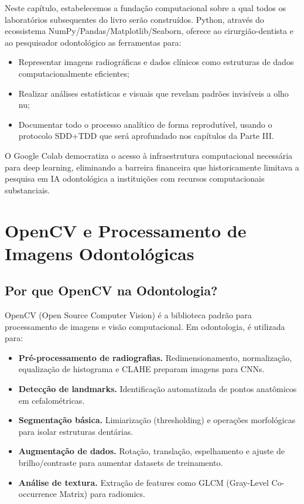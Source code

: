 Neste capítulo, estabelecemos a fundação computacional sobre a qual todos os laboratórios subsequentes do livro serão construídos. Python, através do ecossistema NumPy/Pandas/Matplotlib/Seaborn, oferece ao cirurgião-dentista e ao pesquisador odontológico as ferramentas para:

\begin{itemize}
    \item Representar imagens radiográficas e dados clínicos como estruturas de dados computacionalmente eficientes;
    \item Realizar análises estatísticas e visuais que revelam padrões invisíveis a olho nu;
    \item Documentar todo o processo analítico de forma reprodutível, usando o protocolo SDD+TDD que será aprofundado nos capítulos da Parte III.
\end{itemize}

O Google Colab democratiza o acesso à infraestrutura computacional necessária para deep learning, eliminando a barreira financeira que historicamente limitava a pesquisa em IA odontológica a instituições com recursos computacionais substanciais.

\section{OpenCV e Processamento de Imagens Odontológicas}

\subsection{Por que OpenCV na Odontologia?}

OpenCV (Open Source Computer Vision)  é a biblioteca padrão para processamento de imagens e visão computacional. Em odontologia, é utilizada para:

\begin{itemize}
    \item \textbf{Pré-processamento de radiografias.} Redimensionamento, normalização, equalização de histograma e CLAHE preparam imagens para CNNs.
    \item \textbf{Detecção de landmarks.} Identificação automatizada de pontos anatômicos em cefalométricas.
    \item \textbf{Segmentação básica.} Limiarização (thresholding) e operações morfológicas para isolar estruturas dentárias.
    \item \textbf{Augmentação de dados.} Rotação, translação, espelhamento e ajuste de brilho/contraste para aumentar datasets de treinamento.
    \item \textbf{Análise de textura.} Extração de features como GLCM (Gray-Level Co-occurrence Matrix) para radiomics.
\end{itemize}

